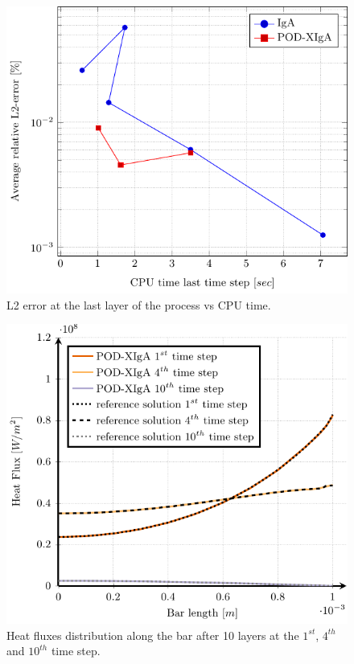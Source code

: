 \documentclass[3p]{article}
\begin{document}
\begin{figure}[!h]
\centering
  \includegraphics[width=0.75\linewidth]{externals/pgfplots/PODXIGA/L2ErrorVsCPUTime.pdf}
    \caption{L2 error at the last layer of the process vs CPU time.}
	\label{L2TimeError} 
\end{figure}

\begin{figure}[!h]
\centering

\includegraphics[width=0.75\linewidth]{externals/pgfplots/LastLayerFluxesComparisonMultiscale.pdf}

    \caption{Heat fluxes distribution along the bar after 10 layers at the $1^{st}$, $4^{th}$ and $10^{th}$ time step.}
    \label{HeatFluxes}
\end{figure}

\end{document}
